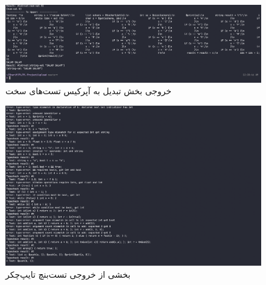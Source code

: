 \documentclass{article}
\begin{document}
\begin{figure}[h]
           \centering
        \includegraphics[width=1\linewidth]{pics/toupper.png}
        \caption{خروجی بخش تبدیل به آپرکیس تست‌های سخت}
\end{figure}
\begin{figure}[h]
           \centering
        \includegraphics[width=1\linewidth]{pics/test-check.png}
        \caption{بخشی از خروجی تست‌بنچ تایپ‌چکر}
\end{figure}

\FloatBarrier
\end{document}
